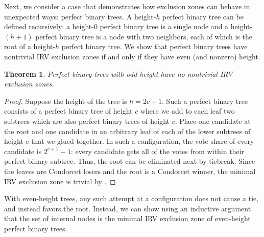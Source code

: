 \documentclass{article}
\theoremstyle{theorem}
\newtheorem{theorem}{Theorem}
\theoremstyle{definition}
\begin{document}
Next, we consider a case that demonstrates how exclusion zones can behave in unexpected ways: perfect binary trees. A height-$h$ perfect binary tree can be defined recursively: a height-0 perfect binary tree is a single node and a height-$(h+1)$ perfect binary tree is a node with two neighbors, each of which is the root of a height-$h$ perfect binary tree. We show that perfect binary trees have nontrivial IRV exclusion zones if and only if they have even (and nonzero) height. 

\begin{theorem}\label{thm:binary-tree-odd}
  Perfect binary trees with odd height have no nontrivial IRV exclusion zones.
\end{theorem}
\begin{proof}
    Suppose the height of the tree is $h = 2c + 1$. Such a perfect binary tree consists of a perfect binary tree of height $c$ where we add to each leaf two subtrees which are also perfect binary trees of height $c$. Place one candidate at the root and one candidate in an arbitrary leaf of each of the lower subtrees of height $c$ that we glued together. In such a configuration, the vote share of every candidate is $2^{c+1}-1$: every candidate gets all of the votes from within their perfect binary subtree. Thus, the root can be eliminated next by tiebreak. Since the leaves are Condorcet losers and the root is a Condorcet winner, the minimal IRV exclusion zone is trivial by .
\end{proof}
With even-height trees, any such attempt at a configuration does not cause a tie, and instead favors the root. Instead, we can show using an inductive argument that the set of internal nodes is the minimal IRV exclusion zone of even-height perfect binary trees.
\end{document}
